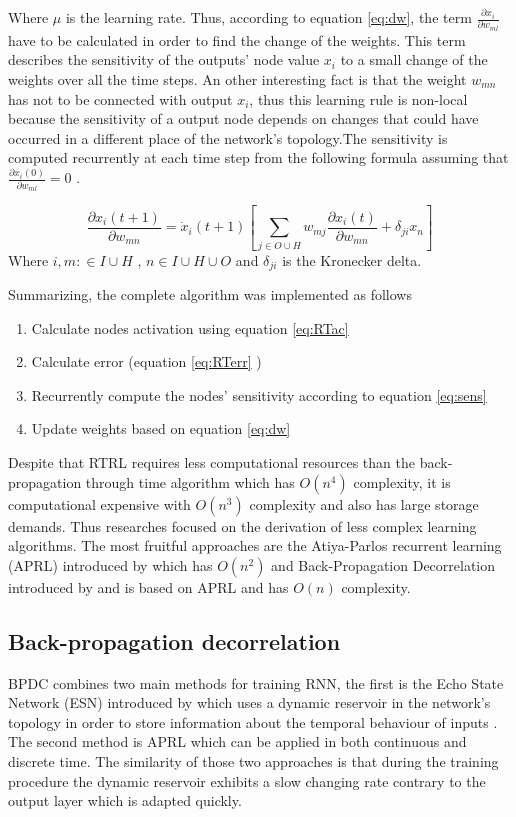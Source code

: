 \documentclass[msc,ai,logo]{infthesis}
\begin{document}
  Where $ \mu$ is the learning rate. Thus, according to equation \ref{eq:dw}, the term ${\frac{{\partial {x_i}}}{{\partial {w_{ml}}}}}$ have to be calculated in order to find the change of the weights. This term describes the sensitivity of the outputs' node value $x_i$ to a small change of the weights over all the time steps. An other interesting fact is that the weight $w_{mn}$ has not to be connected with output $x_i$, thus this learning rule is non-local because the sensitivity of a output node depends on changes that could have occurred in a different place of the network's topology.The sensitivity is computed recurrently at each time step from the following formula assuming that $\frac{{\partial {x_i}(0)}}{{\partial {w_{ml}}}} = 0$ .
  
  \begin{equation}
\frac{{\partial {x_i}(t + 1)}}{{\partial {w_{mn}}}} = {\dot x_i}(t + 1)\left[ {\sum\limits_{j \in O \cup H}^{} {{w_{mj}}\frac{{\partial {x_i}(t)}}{{\partial {w_{mn}}}}} + \delta_{ji}x_n} \right]
\label{eq:sens}
   \end{equation} 
Where $i,m: \in I \cup H$ ,  $n \in I \cup H \cup O $ and $\delta_{ji}$ is the Kronecker delta.


Summarizing, the complete algorithm was implemented as follows
\begin{enumerate}
\item Calculate nodes activation using equation \ref{eq:RTac}
\item Calculate error (equation \ref{eq:RTerr} )
\item Recurrently compute the nodes' sensitivity according to equation \ref{eq:sens}  
\item Update weights based on equation \ref{eq:dw}  
\end{enumerate}

Despite that RTRL requires less computational resources than the back-propagation through time algorithm which has $O(n^4)$ complexity, it is computational expensive with $O(n^3)$ complexity and also has large storage demands. Thus researches focused on the derivation of less complex learning algorithms. The most fruitful approaches are the Atiya-Parlos recurrent learning (APRL) introduced by \cite{Atiya} which has $O(n^2)$ and Back-Propagation Decorrelation introduced by \cite{Steil} and is based on APRL and has $O(n)$ complexity.     

\subsection{Back-propagation decorrelation}
\label{ss:BPDC}
BPDC combines two main methods for training RNN, the first is the Echo State Network (ESN) introduced by \cite{jaeger} which uses a dynamic reservoir in the network's topology in order to store information about the temporal behaviour of inputs \citep{Steil}. The second method is APRL which can be applied in both continuous and discrete time. The similarity of those two approaches is that during the training procedure the dynamic reservoir exhibits a slow changing rate contrary to the output layer which is adapted quickly.
\end{document}
